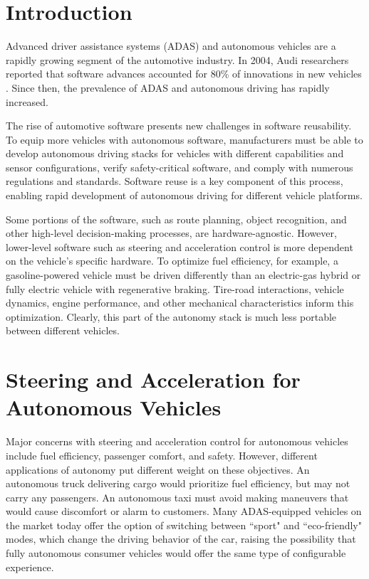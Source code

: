 \documentclass[conference]{IEEEtran}
\begin{document}
\section*{Introduction}

Advanced driver assistance systems (ADAS) and autonomous vehicles are a rapidly growing segment of the automotive industry. In 2004, Audi researchers reported that software advances accounted for 80\% of innovations in new vehicles \cite{softwarereuse2004}. Since then, the prevalence of ADAS and autonomous driving has rapidly increased.

The rise of automotive software presents new challenges in software reusability. To equip more vehicles with autonomous software, manufacturers must be able to develop autonomous driving stacks for vehicles with different capabilities and sensor configurations, verify safety-critical software, and comply with numerous regulations and standards. Software reuse is a key component of this process, enabling rapid development of autonomous driving for different vehicle platforms.

Some portions of the software, such as route planning, object recognition, and other high-level decision-making processes, are hardware-agnostic. However, lower-level software such as steering and acceleration control is more dependent on the vehicle's specific hardware. To optimize fuel efficiency, for example, a gasoline-powered vehicle must be driven differently than an electric-gas hybrid or fully electric vehicle with regenerative braking. Tire-road interactions, vehicle dynamics, engine performance, and other mechanical characteristics inform this optimization. Clearly, this part of the autonomy stack is much less portable between different vehicles.


\section*{Steering and Acceleration for Autonomous Vehicles}

Major concerns with steering and acceleration control for autonomous vehicles include fuel efficiency, passenger comfort, and safety. However, different applications of autonomy put different weight on these objectives. An autonomous truck delivering cargo would prioritize fuel efficiency, but may not carry any passengers. An autonomous taxi must avoid making maneuvers that would cause discomfort or alarm to customers. Many ADAS-equipped vehicles on the market today offer the option of switching between ``sport" and ``eco-friendly" modes, which change the driving behavior of the car, raising the possibility that fully autonomous consumer vehicles would offer the same type of configurable experience. %
\end{document}
